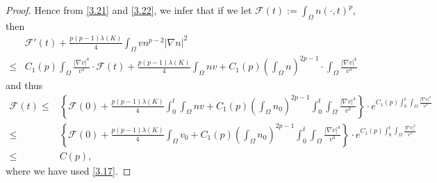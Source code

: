 \documentclass[12pt]{article}
\theoremstyle{plain}
\theoremstyle{definition}
\numberwithin{equation}{section}
\begin{document}
\begin{proof}
Hence from  \eqref{3.21} and   \eqref{3.22}, we infer that  if we let $\mathcal{F}(t):=\int_\Omega n(\cdot,t)^p$, then
\begin{equation*}
\begin{split}
&\mathcal{F}'(t)+\frac {p(p-1)\lambda(K)}4 \int_\Omega vn^{p-2}|\nabla n|^2\\
\leq &C_1(p) \int_\Omega \frac{|\nabla v|^4}{v^3} \cdot \mathcal{F}(t)+
\frac {p(p-1)\lambda(K)}4 \int_\Omega n v+C_1(p)\left(\int_\Omega  n\right)^{2p-1}
 \cdot  \int_\Omega \frac{|\nabla v|^4}{v^3}
   \end{split}
\end{equation*}
and thus
\begin{equation*}
\begin{split}
\mathcal{F}(t)\leq & \left\{\mathcal{F}(0)+
\frac {p(p-1)\lambda(K)}4 \int_0^t\int_\Omega n v+C_1(p)\left(\int_\Omega  n_0\right)^{2p-1} \int_0^t\int_\Omega \frac{|\nabla v|^4}{v^3}\right\} \cdot e^{C_1(p)\int_0^t \int_\Omega \frac{|\nabla v|^4}{v^3} } \\
\leq &
\left\{\mathcal{F}(0)+
\frac {p(p-1)\lambda(K)}4 \int_\Omega  v_0+C_1(p)\left(\int_\Omega  n_0\right)^{2p-1} \int_0^t\int_\Omega \frac{|\nabla v|^4}{v^3}\right\} \cdot e^{C_1(p)\int_0^t \int_\Omega \frac{|\nabla v|^4}{v^3} }
\\
\leq & C(p),
 \end{split}
\end{equation*}
where we have used \eqref{3.17}.
\vspace{12pt}
\end{proof}
\end{document}
